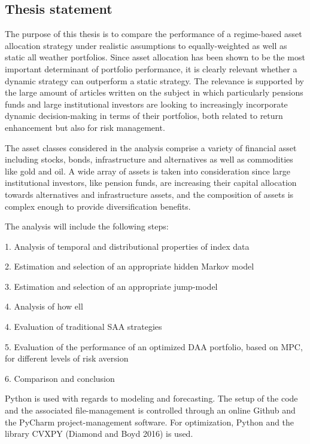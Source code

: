 \subsection{Thesis statement}
The purpose of this thesis is to compare the performance of a regime-based asset allocation strategy under realistic assumptions to equally-weighted as well as static all weather portfolios. Since asset allocation has been shown to be the most important determinant of portfolio performance, it is clearly relevant whether a dynamic strategy can outperform a static strategy. The relevance is supported by the large amount of articles written on the subject in which particularly pensions funds and large institutional investors are looking to increasingly incorporate dynamic decision-making in terms of their portfolios, both related to return enhancement but also for risk management.

The asset classes considered in the analysis comprise a variety of financial asset including stocks, bonds, infrastructure and alternatives as well as commodities like gold and oil. A wide array of assets is taken into consideration since large institutional investors, like pension funds, are increasing their capital allocation towards alternatives and infrastructure assets, and the composition of assets is complex enough to provide diversification benefits. 

The analysis will include the following steps:

1. Analysis of temporal and distributional properties of index data

2. Estimation and selection of an appropriate hidden Markov model

3. Estimation and selection of an appropriate jump-model

4. Analysis of how ell

4. Evaluation of traditional SAA strategies

5. Evaluation of the performance of an optimized DAA portfolio, based on MPC, for different levels of risk aversion

6. Comparison and conclusion


Python is used with regards to modeling and forecasting. The setup of the code and the associated file-management is controlled through an online Github and the PyCharm project-management software. For optimization, Python and the library CVXPY (Diamond and Boyd 2016) is used.


